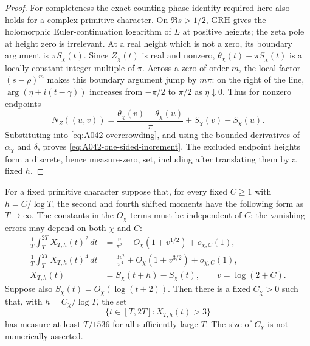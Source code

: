 \begin{proof}
For completeness the exact counting-phase identity required here
also holds for a complex primitive character. On $\Re s>1/2$,
GRH gives the holomorphic Euler-continuation logarithm of $L$ at
positive heights; the zeta pole at height zero is irrelevant.
At a real height which is not a zero, its boundary argument is
$\pi S_\chi(t)$. Since $Z_\chi(t)$ is real and nonzero,
$\theta_\chi(t)+\pi S_\chi(t)$ is a locally constant integer
multiple of $\pi$. Across a zero of order $m$, the local factor
$(s-\rho)^m$ makes this boundary argument jump by $m\pi$:
on the right of the line, $\arg(\eta+i(t-\gamma))$ increases
from $-\pi/2$ to $\pi/2$ as $\eta\downarrow0$.
Thus for nonzero endpoints
\[
 N_Z((u,v))=\frac{\theta_\chi(v)-\theta_\chi(u)}\pi
                              +S_\chi(v)-S_\chi(u).
\]
Substituting into \eqref{eq:A042-overcrowding}, and using the
bounded derivatives of $\alpha_\chi$ and $\delta$, proves
\eqref{eq:A042-one-sided-increment}. The excluded endpoint
heights form a discrete, hence measure-zero, set, including
after translating them by a fixed $h$.
\end{proof}

\begin{lemma}
\label{lem:A042-positive-tail}
For a fixed primitive character suppose that, for every fixed
$C\ge1$ with $h=C/\log T$, the second and fourth shifted
moments have the following form as $T\longrightarrow\infty$.
The constants in the $O_\chi$ terms must be independent of $C$;
the vanishing errors may depend on both $\chi$ and $C$:
\begin{align}\label{eq:A042-moments}
 \frac1T\int_T^{2T}X_{T,h}(t)^2\,dt
      &=\frac{v}{\pi^2}+O_\chi(1+v^{1/2})+o_{\chi,C}(1),\\
 \frac1T\int_T^{2T}X_{T,h}(t)^4\,dt
      &=\frac{3v^2}{\pi^4}+O_\chi(1+v^{3/2})+o_{\chi,C}(1),\nonumber\\
 X_{T,h}(t)&=S_\chi(t+h)-S_\chi(t),\qquad
                         v=\log(2+C).\nonumber
\end{align}
Suppose also $S_\chi(t)=O_\chi(\log(t+2))$.
Then there is a fixed $C_\chi>0$ such that, with
$h=C_\chi/\log T$, the set
\[
            \{t\in[T,2T]:X_{T,h}(t)>3\}
\]
has measure at least $T/1536$ for all sufficiently large $T$.
The size of $C_\chi$ is not numerically asserted.
\end{lemma}

